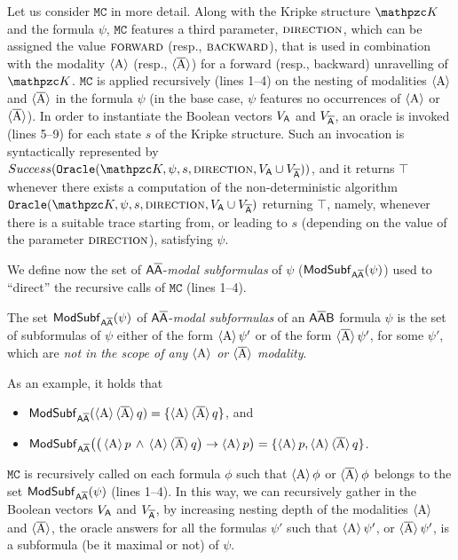 Let us consider $\texttt{MC}$ in more detail. Along with the Kripke structure $\Ku$ and the formula $\psi$, $\texttt{MC}$ features a third parameter, $\textsc{direction}$, which can be assigned the value $\textsc{forward}$ (resp., $\textsc{backward}$), that is used in combination with the modality $\operatorname{\langle A\rangle}$ (resp., $\operatorname{\langle \overline{A}\rangle}$) for a forward (resp., backward) unravelling of $\Ku$. 
%
$\texttt{MC}$ is applied recursively (lines 1--4) on the nesting of modalities $\operatorname{\langle A\rangle}$ and $\operatorname{\langle \overline{A}\rangle}$ in the formula $\psi$ (in the base case, $\psi$ features no occurrences of $\operatorname{\langle A\rangle}$ or $\operatorname{\langle \overline{A}\rangle}$). In order to instantiate the Boolean vectors $V_{\mathsf{A}}$ and $V_{\mathsf{\overline{A}}}$, an oracle is invoked (lines 5--9) for each state $s$ of the Kripke structure. Such an invocation is syntactically represented by $Success(\texttt{Oracle}(\Ku,\psi,s,\textsc{direction},V_{\A}\cup V_{\Abar}))$, and it returns $\top$ whenever there exists a computation of the non-deterministic algorithm $\texttt{Oracle}(\Ku,\psi,s,\textsc{direction},\allowbreak V_{\A}\cup V_{\Abar})$ returning $\top$, namely, whenever there is a suitable trace starting from, or leading to $s$ (depending on the value of the parameter $\textsc{direction}$), satisfying $\psi$.


We define now the set of $\mathsf{A\overline{A}}$-\emph{modal subformulas} of $\psi$ ($\mathsf{ModSubf}_{\mathsf{A\overline{A}}}(\psi)$) used to ``direct'' the recursive calls of $\texttt{MC}$ (lines 1--4).
\begin{definition}\label{def:modsubf}
The set $\mathsf{ModSubf}_{\mathsf{A\overline{A}}}(\psi)$ of $\mathsf{A\overline{A}}$-\emph{modal subformulas} of an $\mathsf{A\overline{A}B}$ formula $\psi$ is the set of subformulas of $\psi$  either of the form $\operatorname{\langle A\rangle} \psi'$ or of the form $\operatorname{\langle \overline{A}\rangle} \psi'$, for some $\psi'$, which are \emph{not in the scope of any $\operatorname{\langle A\rangle}$ or $\operatorname{\langle \overline{A}\rangle}$ modality}.
\end{definition}
%
As an example, it holds that
\begin{itemize}
    \item $\mathsf{ModSubf}_{\mathsf{A\overline{A}}}(\operatorname{\langle A\rangle}\operatorname{\langle \overline{A}\rangle} q)=\{\operatorname{\langle A\rangle}\operatorname{\langle \overline{A}\rangle} q\}$, and
    \item $\mathsf{ModSubf}_{\mathsf{A\overline{A}}}\big(\big(\operatorname{\langle A\rangle} p\, \wedge\, \operatorname{\langle A\rangle}\operatorname{\langle \overline{A}\rangle} q \big)\rightarrow \operatorname{\langle A\rangle} p\big)\allowbreak =\{\operatorname{\langle A\rangle} p,\operatorname{\langle A\rangle}\operatorname{\langle \overline{A}\rangle} q\}$.
\end{itemize}

$\texttt{MC}$ is recursively called on each formula $\phi$ such that $\operatorname{\langle A\rangle}\phi$ or $\operatorname{\langle \overline{A}\rangle}\phi$ belongs to the set $\mathsf{ModSubf}_{\mathsf{A\overline{A}}}(\psi)$ (lines 1--4). 
In this way, we can recursively gather in the Boolean vectors $V_{\mathsf{A}}$ and $V_{\mathsf{\overline{A}}}$, by increasing nesting depth of the modalities $\operatorname{\langle A\rangle}$ and $\operatorname{\langle \overline{A}\rangle}$, the oracle answers for all the formulas $\psi'$ such that $\operatorname{\langle A\rangle}\psi'$, or $\operatorname{\langle \overline{A}\rangle}\psi'$, is a subformula (be it maximal or not) of $\psi$.


